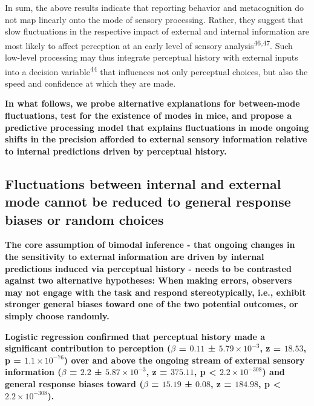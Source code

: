 \documentclass[
]{article}
\begin{document}
In sum, the above results indicate that reporting behavior and
metacognition do not map linearly onto the mode of sensory processing.
Rather, they suggest that slow fluctuations in the respective impact of
external and internal information are most likely to affect perception
at an early level of sensory analysis\textsuperscript{46,47}. Such
low-level processing may thus integrate perceptual history with external
inputs into a decision variable\textsuperscript{44} that influences not
only perceptual choices, but also the speed and confidence at which they
are made.

\textbf{In what follows, we probe alternative explanations for
between-mode fluctuations, test for the existence of modes in mice, and
propose a predictive processing model that explains fluctuations in mode
ongoing shifts in the precision afforded to external sensory information
relative to internal predictions driven by perceptual history.}

\hypertarget{fluctuations-between-internal-and-external-mode-cannot-be-reduced-to-general-response-biases-or-random-choices}{%
\subsection{Fluctuations between internal and external mode cannot be
reduced to general response biases or random
choices}\label{fluctuations-between-internal-and-external-mode-cannot-be-reduced-to-general-response-biases-or-random-choices}}

\textbf{The core assumption of bimodal inference - that ongoing changes
in the sensitivity to external information are driven by internal
predictions induced via perceptual history - needs to be contrasted
against two alternative hypotheses: When making errors, observers may
not engage with the task and respond stereotypically, i.e., exhibit
stronger general biases toward one of the two potential outcomes, or
simply choose randomly.}

\textbf{Logistic regression confirmed that perceptual history made a
significant contribution to perception (\(\beta\) = \(0.11\) ±
\(\ensuremath{5.79\times 10^{-3}}\), z = \(18.53\), p =
\(\ensuremath{1.1\times 10^{-76}}\)) over and above the ongoing stream
of external sensory information (\(\beta\) = \(2.2\) ±
\(\ensuremath{5.87\times 10^{-3}}\), z = \(375.11\), p < \(\ensuremath{2.2\times 10^{-308}}\)) and
general response biases toward (\(\beta\) = \(15.19\) ± \(0.08\), z =
\(184.98\), p < \(\ensuremath{2.2\times 10^{-308}}\)).}
\end{document}

